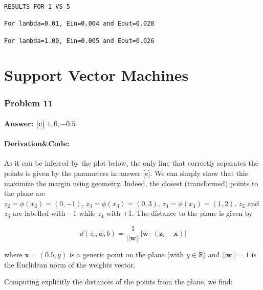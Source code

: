 \documentclass[11pt]{article}
\begin{document}
    \begin{Verbatim}[commandchars=\\\{\}]
RESULTS FOR 1 VS 5

For lambda=0.01, Ein=0.004 and Eout=0.028

For lambda=1.00, Ein=0.005 and Eout=0.026

    \end{Verbatim}

    \hypertarget{support-vector-machines}{%
\part{Support Vector Machines}\label{support-vector-machines}}

\hypertarget{problem-11}{%
\section{Problem 11}\label{problem-11}}

\hypertarget{answer-c-10-0.5}{%
\subsection{\texorpdfstring{Answer: {[}c{]}
\(1,0,-0.5\)}{Answer: {[}c{]} 1,0,-0.5}}\label{answer-c-10-0.5}}

\hypertarget{derivationcode}{%
\subsection{Derivation\&Code:}\label{derivationcode}}

As it can be inferred by the plot below, the only line that correctly
separates the points is given by the parameters in answer {[}c{]}. We
can simply show that this maximize the margin using geometry. Indeed,
the closest (transformed) points to the plane are
\(z_2=\phi(x_2)=(0,-1), \,z_3=\phi(x_3)=(0,3),\, z_4=\phi(x_4)=(1,2)\).
\(z_2\) and \(z_3\) are labelled with \(-1\) while \(z_4\) with \(+1\).
The distance to the plane is given by

\begin{equation}
d(z_i,w,b)=\frac{1}{||\mathbf{w}||}|\mathbf{w}\cdot(\mathbf{z}_i-\mathbf{x})|
\end{equation}

where \(\mathbf{x}=(0.5,y)\) is a generic point on the plane (with
\(y\in\mathbb{R}\)) and \(||\mathbf{w}||=1\) is the Euclidean norm of
the weights vector.

Computing explicitly the distances of the points from the plane, we
find:
\end{document}
